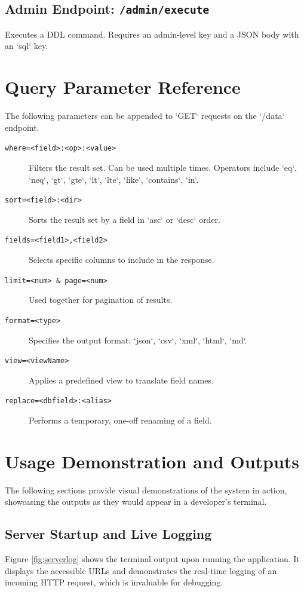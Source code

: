 \documentclass[12pt, a4paper]{report}
\begin{document}
\subsection{Admin Endpoint: \texttt{/admin/execute}}
Executes a DDL command. Requires an admin-level key and a JSON body with an `sql` key.

\section{Query Parameter Reference}
The following parameters can be appended to `GET` requests on the `/data` endpoint.

\begin{description}
    \item[\texttt{where=<field>:<op>:<value>}] Filters the result set. Can be used multiple times. Operators include `eq`, `neq`, `gt`, `gte`, `lt`, `lte`, `like`, `contains`, `in`.
    \item[\texttt{sort=<field>:<dir>}] Sorts the result set by a field in `asc` or `desc` order.
    \item[\texttt{fields=<field1>,<field2>}] Selects specific columns to include in the response.
    \item[\texttt{limit=<num> \& page=<num>}] Used together for pagination of results.
    \item[\texttt{format=<type>}] Specifies the output format: `json`, `csv`, `xml`, `html`, `md`.
    \item[\texttt{view=<viewName>}] Applies a predefined view to translate field names.
   \item[\texttt{replace=\textless{}db\textunderscore{}field\textgreater{}:\textless{}alias\textgreater{}}] Performs a temporary, one-off renaming of a field.
\end{description}

\section{Usage Demonstration and Outputs}
The following sections provide visual demonstrations of the system in action, showcasing the outputs as they would appear in a developer's terminal.

\subsection{Server Startup and Live Logging}
Figure \ref{fig:serverlog} shows the terminal output upon running the application. It displays the accessible URLs and demonstrates the real-time logging of an incoming HTTP request, which is invaluable for debugging.
\end{document}
